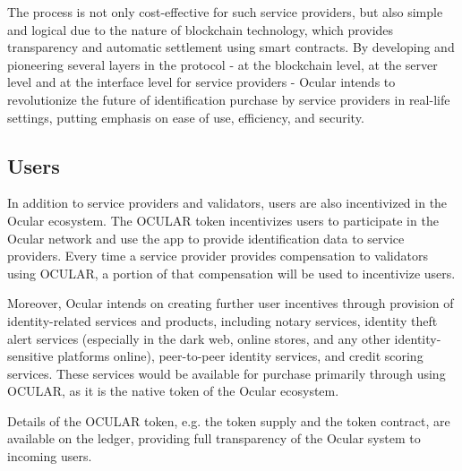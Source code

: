 \documentclass[a4paper]{article}
\begin{document}
The process is not only cost-effective for such service providers, but also simple and logical due to the nature of blockchain technology, which provides transparency and automatic settlement using smart contracts. By developing and pioneering several layers in the protocol - at the blockchain level, at the server level and at the interface level for service providers - Ocular intends to revolutionize the future of identification purchase by service providers in real-life settings, putting emphasis on ease of use, efficiency, and security.

\subsection{Users}
In addition to service providers and validators, users are also incentivized in the Ocular ecosystem. The OCULAR token incentivizes users to participate in the Ocular network and use the app to provide identification data to service providers. Every time a service provider provides compensation to validators using OCULAR, a portion of that compensation will be used to incentivize users.

Moreover, Ocular intends on creating further user incentives through provision of identity-related services and products, including notary services, identity theft alert services (especially in the dark web, online stores, and any other identity-sensitive platforms online), peer-to-peer identity services, and credit scoring services. These services would be available for purchase primarily through using OCULAR, as it is the native token of the Ocular ecosystem.

Details of the OCULAR token, e.g. the token supply and the token contract, are available on the ledger, providing full transparency of the Ocular system to incoming users. 
\end{document}
